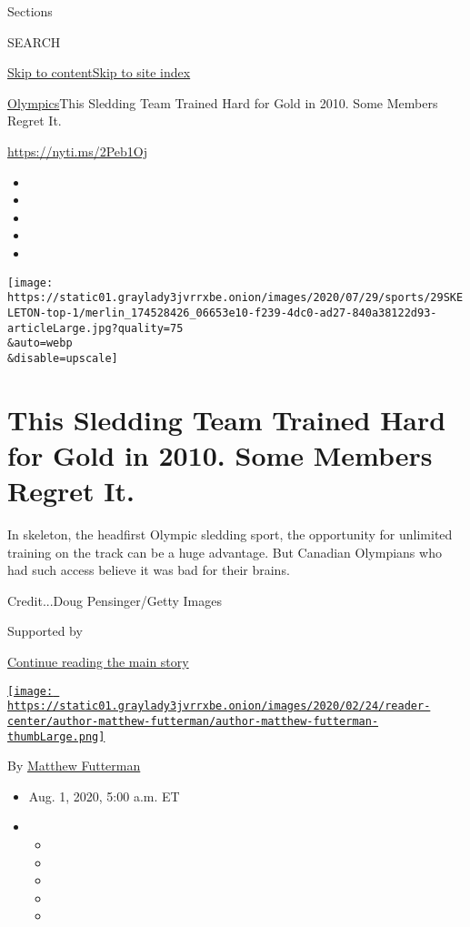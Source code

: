 Sections

SEARCH

\protect\hyperlink{site-content}{Skip to
content}\protect\hyperlink{site-index}{Skip to site index}

\href{/section/sports/olympics}{Olympics}\textbar{}This Sledding Team
Trained Hard for Gold in 2010. Some Members Regret It.

\url{https://nyti.ms/2Peb1Oj}

\begin{itemize}
\item
\item
\item
\item
\item
\end{itemize}

\texttt{[image: https://static01.graylady3jvrrxbe.onion/images/2020/07/29/sports/29SKELETON-top-1/merlin\_174528426\_06653e10-f239-4dc0-ad27-840a38122d93-articleLarge.jpg?quality=75\\\&auto=webp\\\&disable=upscale]}

\hypertarget{this-sledding-team-trained-hard-for-gold-in-2010-some-members-regret-it}{%
\section{This Sledding Team Trained Hard for Gold in 2010. Some Members
Regret
It.}\label{this-sledding-team-trained-hard-for-gold-in-2010-some-members-regret-it}}

In skeleton, the headfirst Olympic sledding sport, the opportunity for
unlimited training on the track can be a huge advantage. But Canadian
Olympians who had such access believe it was bad for their brains.

Credit...Doug Pensinger/Getty Images

Supported by

\protect\hyperlink{after-sponsor}{Continue reading the main story}

\href{https://www.nytimes3xbfgragh.onion/by/matthew-futterman}{\texttt{[image: https://static01.graylady3jvrrxbe.onion/images/2020/02/24/reader-center/author-matthew-futterman/author-matthew-futterman-thumbLarge.png]}}

By
\href{https://www.nytimes3xbfgragh.onion/by/matthew-futterman}{Matthew
Futterman}

\begin{itemize}
\item
  Aug. 1, 2020, 5:00 a.m. ET
\item
  \begin{itemize}
  \item
  \item
  \item
  \item
  \item
  \end{itemize}
\end{itemize}

